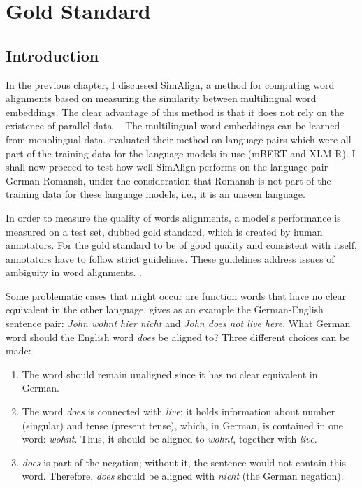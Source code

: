 \chapter{Gold Standard}
\label{chap:gold-standard}
\section{Introduction}
In the previous chapter, I discussed SimAlign, a method for computing word alignments based on measuring the similarity between multilingual word embeddings. 
The clear advantage of this method is that it does not rely on the existence  of parallel data--- 
The multilingual word embeddings can be learned from monolingual data. 
\cite{jalili-sabet-etal-2020-simalign} evaluated their method on language pairs which were all part of the training data for the language models in use (mBERT and XLM-R). 
I shall now proceed to test how well SimAlign performs on the language pair German-Romansh, under the consideration that Romansh is not part of  the training data for these language models, i.e., it is an unseen language. 


In order to measure the quality of words alignments, a model's performance is measured on a test set, dubbed  gold standard, which is created by human annotators. 
For the gold standard to be of good quality and consistent with itself, annotators have to follow strict guidelines.
These guidelines address issues of ambiguity in word alignments. \autocite[115]{koehn2009}. 

Some problematic cases that might occur are function words\footnotemark{} that have no clear equivalent in the other language.
\cite{koehn2009} gives as an example the German-English sentence pair: \emph{John wohnt hier nicht}  and \emph{John does not live here}. 
What German word should the English word \emph{does} be aligned to? 
Three different choices can be made:
\begin{enumerate}
	\item The word should remain unaligned since it has no clear equivalent in German.
	\item The word \emph{does} is connected with \emph{live}; it holds information about number (singular) and tense (present tense), which, in German, is contained in one word: \emph{wohnt}. Thus, it should be aligned to \emph{wohnt}, together with \emph{live}.
	\item \emph{does} is part of the negation; without it, the sentence would not contain this word. Therefore, \emph{does} should be aligned with \emph{nicht} (the German negation).
\end{enumerate}

